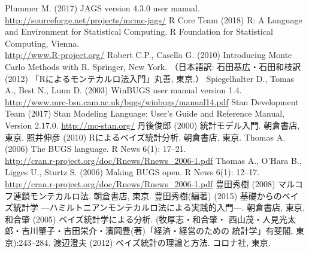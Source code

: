 \documentclass[11pt,uplatex]{jsarticle}
\begin{document}
\begin{thebibliography}{99}
 Plummer M. (2017) JAGS version 4.3.0 user manual.\\
  \url{http://sourceforge.net/projects/mcmc-jags/}
 R Core Team (2018)
   R: A Language and Environment for Statistical Computing.
   R Foundation for Statistical Computing, Vienna.\\
   \url{http://www.R-project.org/}
 Robert C.P., Casella G. (2010) Introducing Monte Carlo Methods with R.
  Springer, New York.
  （日本語訳: 石田基広・石田和枝訳 (2012) 「Rによるモンテカルロ法入門」丸善, 東京.）
 Spiegelhalter D., Tomas A., Best N., Lunn D. (2003)
  WinBUGS user manual version 1.4.\\
  \url{http://www.mrc-bsu.cam.ac.uk/bugs/winbugs/manual14.pdf}
 Stan Development Team (2017) Stan Modeling Language:
  User's Guide and Reference Manual, Version 2.17.0.
  \url{http://mc-stan.org/}
 丹後俊郎 (2000) 統計モデル入門. 朝倉書店, 東京.
 照井伸彦 (2010) Rによるベイズ統計分析. 朝倉書店, 東京.
 Thomas A. (2006) The BUGS language.
  R News 6(1): 17--21. \\
  \url{http://cran.r-project.org/doc/Rnews/Rnews_2006-1.pdf}
 Thomas A., O'Hara B., Ligges U., Sturtz S. (2006) Making BUGS open.
  R News 6(1): 12--17. \\
  \url{http://cran.r-project.org/doc/Rnews/Rnews_2006-1.pdf}
 豊田秀樹 (2008) マルコフ連鎖モンテカルロ法. 朝倉書店, 東京.
 豊田秀樹(編著) (2015) 基礎からのベイズ統計学
  ---ハミルトニアンモンテカルロ法による実践的入門---. 朝倉書店, 東京.
 和合肇 (2005) ベイズ統計学による分析. (牧厚志・和合肇・
  西山茂・人見光太郎・吉川肇子・吉田栄介・濱岡豊(著)「経済・経営のための
  統計学」有斐閣, 東京):243--284.
 渡辺澄夫 (2012) ベイズ統計の理論と方法. コロナ社, 東京.
\end{thebibliography}
\end{document}
